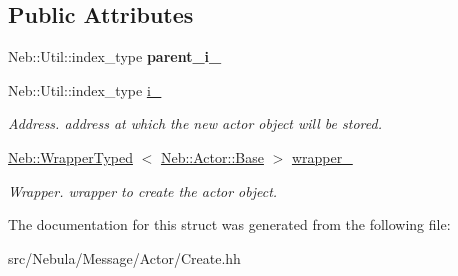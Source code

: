 \subsection*{\-Public \-Attributes}
\begin{DoxyCompactItemize}
\item 
\hypertarget{structNeb_1_1Message_1_1Actor_1_1Create_ae57470da4685ee6c6bd57ee95e0c0ad2}{\-Neb\-::\-Util\-::index\-\_\-type {\bfseries parent\-\_\-i\-\_\-}}\label{structNeb_1_1Message_1_1Actor_1_1Create_ae57470da4685ee6c6bd57ee95e0c0ad2}

\item 
\hypertarget{structNeb_1_1Message_1_1Actor_1_1Create_a457b7312da82197cacca239638aec999}{\-Neb\-::\-Util\-::index\-\_\-type \hyperlink{structNeb_1_1Message_1_1Actor_1_1Create_a457b7312da82197cacca239638aec999}{i\-\_\-}}\label{structNeb_1_1Message_1_1Actor_1_1Create_a457b7312da82197cacca239638aec999}

\begin{DoxyCompactList}\small\item\em \-Address. address at which the new actor object will be stored. \end{DoxyCompactList}\item 
\hypertarget{structNeb_1_1Message_1_1Actor_1_1Create_a6aae87ea763a64722094752017a9ba9b}{\hyperlink{classNeb_1_1WrapperTyped}{\-Neb\-::\-Wrapper\-Typed}\*
$<$ \hyperlink{classNeb_1_1Actor_1_1Base}{\-Neb\-::\-Actor\-::\-Base} $>$ \hyperlink{structNeb_1_1Message_1_1Actor_1_1Create_a6aae87ea763a64722094752017a9ba9b}{wrapper\-\_\-}}\label{structNeb_1_1Message_1_1Actor_1_1Create_a6aae87ea763a64722094752017a9ba9b}

\begin{DoxyCompactList}\small\item\em \-Wrapper. wrapper to create the actor object. \end{DoxyCompactList}\end{DoxyCompactItemize}


\-The documentation for this struct was generated from the following file\-:\begin{DoxyCompactItemize}
\item 
src/\-Nebula/\-Message/\-Actor/\-Create.\-hh\end{DoxyCompactItemize}

